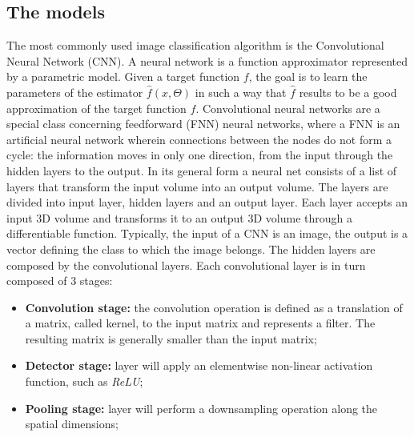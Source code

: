 \subsection{The models}
The most commonly used image classification algorithm is the Convolutional Neural Network (CNN). A neural network is a function approximator represented by a parametric model. Given a target function $f$, the goal is to learn the parameters of the estimator \textbf{$\hat{f}(x,\Theta)$} in such a way that $\hat{f}$ results to be a good approximation of the target function $f$. Convolutional neural networks are a special class concerning feedforward (FNN) neural networks, where a FNN is an artificial neural network wherein connections between the nodes do not form a cycle: the information moves in only one direction, from the input through the hidden layers to the output. In its general form a neural net consists of a list of layers that transform the input volume into an output volume. The layers are divided into input layer, hidden layers and an output layer. Each layer accepts an input 3D volume and transforms it to an output 3D volume through a differentiable function. Typically, the input of a CNN is an image, the output is a vector defining the class to which the image belongs. The hidden layers are composed by the convolutional layers. Each convolutional layer is in turn composed of 3 stages:
\begin{itemize}
\item{\textbf{Convolution stage:} the convolution operation is defined as a translation of a matrix, called kernel, to the input matrix and represents a filter. The resulting matrix is generally smaller than the input matrix;}
\item{\textbf{Detector stage:} layer will apply an elementwise non-linear activation function, such as \textit{ReLU};}
\item{\textbf{Pooling stage:} layer will perform a downsampling operation along the spatial dimensions;}
\end{itemize}
